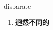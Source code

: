 
\begin{frame}
{\huge disparate}
\begin{center}
\begin{enumerate}\Large
  \item \textbf{迥然不同的}
\end{enumerate}
\end{center}
\end{frame}
